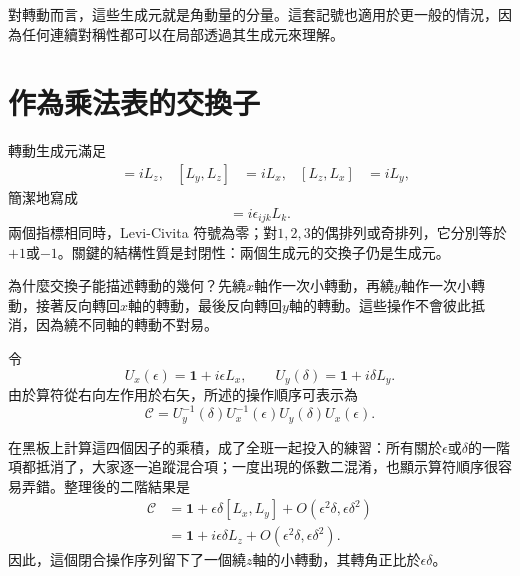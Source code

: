 對轉動而言，這些生成元就是角動量的分量。這套記號也適用於更一般的情況，因為任何連續對稱性都可以在局部透過其生成元來理解。

\section{作為乘法表的交換子}

轉動生成元滿足
\begin{align}
[L_x,L_y]&=iL_z,&
[L_y,L_z]&=iL_x,&
[L_z,L_x]&=iL_y,
\end{align}
簡潔地寫成
\begin{equation}
[L_i,L_j]=i\epsilon_{ijk}L_k.
\end{equation}
兩個指標相同時，Levi-Civita 符號為零；對\(1,2,3\)的偶排列或奇排列，它分別等於\(+1\)或\(-1\)。關鍵的結構性質是封閉性：兩個生成元的交換子仍是生成元。

為什麼交換子能描述轉動的幾何？先繞\(x\)軸作一次小轉動，再繞\(y\)軸作一次小轉動，接著反向轉回\(x\)軸的轉動，最後反向轉回\(y\)軸的轉動。這些操作不會彼此抵消，因為繞不同軸的轉動不對易。

\begin{classroomqa}
\end{classroomqa}

令
\begin{equation}
U_x(\epsilon)=\mathbf 1+i\epsilon L_x,
\qquad
U_y(\delta)=\mathbf 1+i\delta L_y.
\end{equation}
由於算符從右向左作用於右矢，所述的操作順序可表示為
\begin{equation}
\mathcal C
=U_y^{-1}(\delta)U_x^{-1}(\epsilon)
 U_y(\delta)U_x(\epsilon).
\end{equation}

\begin{classroomqa}
\end{classroomqa}

在黑板上計算這四個因子的乘積，成了全班一起投入的練習：所有關於\(\epsilon\)或\(\delta\)的一階項都抵消了，大家逐一追蹤混合項；一度出現的係數二混淆，也顯示算符順序很容易弄錯。整理後的二階結果是
\begin{align}
\mathcal C
&=\mathbf 1+\epsilon\delta[L_x,L_y]
  +O(\epsilon^2\delta,\epsilon\delta^2)\\
&=\mathbf 1+i\epsilon\delta L_z
  +O(\epsilon^2\delta,\epsilon\delta^2).
\end{align}
因此，這個閉合操作序列留下了一個繞\(z\)軸的小轉動，其轉角正比於\(\epsilon\delta\)。

